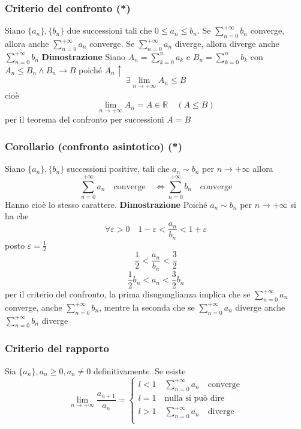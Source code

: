 \documentclass[12pt]{article}
\begin{document}
\subsubsection{Criterio del confronto (*)}
Siano \(\{ a_n \}, \{ b_n \}\) due successioni tali che \(0 \leq a_n \leq b_n\). Se \(\displaystyle \sum_{n=0}^{+\infty} b_n\) converge, allora anche \(\displaystyle \sum_{n=0}^{+\infty} a_n\) converge. Se \(\displaystyle \sum_{n=0}^{+\infty} a_n\) diverge, allora diverge anche \(\displaystyle \sum_{n=0}^{+\infty} b_n\)
\textbf{Dimostrazione}\newline
Siano \(\displaystyle A_n = \sum_{k=0}^{n} a_k\) e \(\displaystyle B_n = \sum_{k=0}^{n} b_k\) con \( A_n \leq B_n \wedge B_n \to B\)
poiché \(A_n \uparrow\)
\[
\exists \lim_{n \to +\infty} A_n \leq B
\]
cioè
\[
\lim_{n \to + \infty} A_n = A \in \mathbb{R} \quad (A\leq B)
\]
per il teorema del confronto per successioni \(A=B\)

\subsubsection{Corollario (confronto asintotico) (*)}
Siano \(\{ a_n \}, \{ b_n \}\) successioni positive, tali che \(a_n \sim b_n\)  per \(n \to +\infty\) allora
\[
\sum_{n=0}^{+\infty} a_n \quad \text{converge} \quad \Leftrightarrow \sum_{n=0}^{+\infty} b_n \quad \text{converge}
\]
Hanno cioè lo stesso carattere.
\newpage
\textbf{Dimostrazione}\newline
Poiché \(a_n \sim b_n\)  per \(n \to +\infty\) si ha che
\[
\forall \varepsilon > 0 \quad 1 - \varepsilon < \frac{a_n}{b_n} < 1 + \varepsilon
\]
posto \(\varepsilon = \frac{1}{2}\)
\[
\frac{1}{2} < \frac{a_n}{b_n} < \frac{3}{2}
\]
\[
\frac{1}{2}b_n < a_n< \frac{3}{2}b_n
\]
per il criterio del confronto, la prima disuguaglianza implica che se \(\displaystyle \sum_{n=0}^{+\infty} a_n\) converge, anche \(\displaystyle \sum_{n=0}^{+\infty} b_n\), mentre la seconda che se \(\displaystyle \sum_{n=0}^{+\infty} a_n\) diverge anche \(\displaystyle \sum_{n=0}^{+\infty} b_n\) diverge

\subsubsection{Criterio del rapporto}
Sia \(\{ a_n \}, a_n \geq 0, a_n \neq 0\) definitivamente. Se esiste
\[
\lim_{n \to +\infty} \frac{a_{n+1}}{a_n} = \begin{cases}
l<1 \quad \sum_{n=0}^{+\infty} a_n \quad \text{converge}\\
l=1 \quad \text{nulla si può dire}\\
l>1 \quad \sum_{n=0}^{+\infty} a_n \quad \text{diverge}\\
\end{cases}
\]
\end{document}
